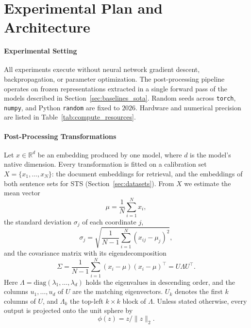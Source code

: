 \section{Experimental Plan and Architecture}
\label{sec:experimental_plan}

\paragraph{Experimental Setting}
All experiments execute without neural network gradient descent, backpropagation, or parameter optimization. The post-processing pipeline operates on frozen representations extracted in a single forward pass of the models described in Section~\ref{sec:baselines_sota}. Random seeds across \texttt{torch}, \texttt{numpy}, and Python \texttt{random} are fixed to $2026$. Hardware and numerical precision are listed in Table~\ref{tab:compute_resources}.

\paragraph{Post-Processing Transformations}
Let $x \in \mathbb{R}^d$ be an embedding produced by one model, where $d$ is the model's native dimension. Every transformation is fitted on a calibration set $X = \{x_1, \dots, x_N\}$: the document embeddings for retrieval, and the embeddings of both sentence sets for STS (Section~\ref{sec:datasets}). From $X$ we estimate the mean vector
\begin{equation}
\mu = \frac{1}{N} \sum_{i=1}^{N} x_i,
\end{equation}
the standard deviation $\sigma_j$ of each coordinate $j$,
\begin{equation}
\sigma_j = \sqrt{\frac{1}{N-1} \sum_{i=1}^{N} (x_{ij} - \mu_j)^2},
\end{equation}
and the covariance matrix with its eigendecomposition
\begin{equation}
\Sigma = \frac{1}{N-1} \sum_{i=1}^{N} (x_i - \mu)(x_i - \mu)^\top = U \Lambda U^\top .
\end{equation}
Here $\Lambda = \mathrm{diag}(\lambda_1, \dots, \lambda_d)$ holds the eigenvalues in descending order, and the columns $u_1, \dots, u_d$ of $U$ are the matching eigenvectors. $U_k$ denotes the first $k$ columns of $U$, and $\Lambda_k$ the top-left $k \times k$ block of $\Lambda$. Unless stated otherwise, every output is projected onto the unit sphere by
\begin{equation}
\phi(z) = z / \|z\|_2 .
\end{equation}

